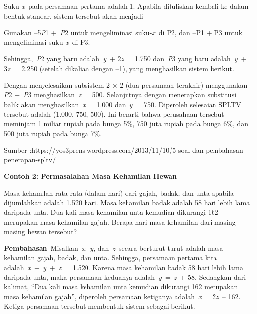 \documentclass[11pt,fleqn]{book} %
\begin{document}
\noindent 

\noindent 

\noindent Suku-\textit{x}~pada persamaan pertama adalah 1. Apabila dituliskan kembali ke dalam bentuk standar, sistem tersebut akan menjadi

\noindent 

\noindent 

\noindent Gunakan --5\textit{P}1 +~\textit{P}2 untuk mengeliminasi suku-\textit{x}~di P2, dan --P1 + P3 untuk mengeliminasi suku-\textit{x}~di P3.

\noindent 

\noindent Sehingga,~\textit{P}2 yang baru adalah~\textit{y}~+ 2\textit{z}~= 1.750 dan~\textit{P}3 yang baru adalah~\textit{y}~+ 3\textit{z}~= 2.250 (setelah dikalian dengan --1), yang menghasilkan sistem berikut.

\noindent 

\noindent 

\noindent Dengan menyelesaikan subsistem 2 $\times$ 2 (dua persamaan terakhir) menggunakan --\textit{P}2 +~\textit{P}3 menghasilkan~\textit{z}~= 500. Selanjutnya dengan menerapkan substitusi balik akan menghasilkan~\textit{x}~= 1.000 dan~\textit{y}~= 750. Diperoleh selesaian SPLTV tersebut adalah (1.000, 750, 500). Ini berarti bahwa perusahaan tersebut meminjam 1 miliar rupiah pada bunga 5\%, 750 juta rupiah pada bunga 6\%, dan 500 juta rupiah pada bunga 7\%.

\noindent Sumber :https://yos3prens.wordpress.com/2013/11/10/5-soal-dan-pembahasan-penerapan-spltv/

\noindent \textbf{}

\noindent \textbf{Contoh 2: Permasalahan Masa Kehamilan Hewan}

\noindent Masa kehamilan rata-rata (dalam hari) dari gajah, badak, dan unta apabila dijumlahkan adalah 1.520 hari. Masa kehamilan badak adalah 58 hari lebih lama daripada unta. Dua kali masa kehamilan unta kemudian dikurangi 162 merupakan masa kehamilan gajah. Berapa hari masa kehamilan dari masing-masing hewan tersebut?

\noindent \textbf{}

\noindent \textbf{Pembahasan}~Misalkan~\textit{x},~\textit{y}, dan~\textit{z}~secara berturut-turut adalah masa kehamilan gajah, badak, dan unta. Sehingga, persamaan pertama kita adalah~\textit{x}~+~\textit{y}~+~\textit{z}~= 1.520. Karena masa kehamilan badak 58 hari lebih lama daripada unta, maka persamaan keduanya adalah~\textit{y}~=~\textit{z}~+ 58. Sedangkan dari kalimat, ``Dua kali masa kehamilan unta kemudian dikurangi 162 merupakan masa kehamilan gajah'', diperoleh persamaan ketiganya adalah~\textit{x}~= 2\textit{z}~-- 162. Ketiga persamaan tersebut membentuk sistem sebagai berikut.
\end{document}
